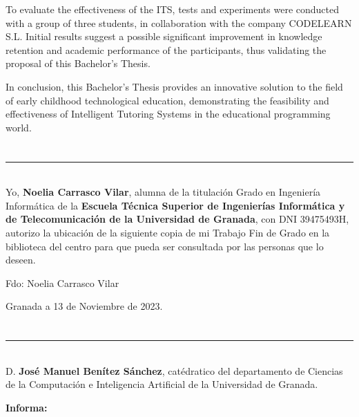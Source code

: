 To evaluate the effectiveness of the ITS, tests and experiments were conducted with a group of three students, in collaboration with the company CODELEARN S.L. Initial results suggest a possible significant improvement in knowledge retention and academic performance of the participants, thus validating the proposal of this Bachelor's Thesis.

In conclusion, this Bachelor's Thesis provides an innovative solution to the field of early childhood technological education, demonstrating the feasibility and effectiveness of Intelligent Tutoring Systems in the educational programming world.

\chapter*{}
\thispagestyle{empty}

\noindent\rule[-1ex]{\textwidth}{2pt}\\[4.5ex]

Yo, \textbf{Noelia Carrasco Vilar}, alumna de la titulación Grado en Ingeniería Informática de la \textbf{Escuela Técnica Superior
de Ingenierías Informática y de Telecomunicación de la Universidad de
Granada}, con DNI 39475493H, autorizo la
ubicación de la siguiente copia de mi Trabajo Fin de Grado en la biblioteca
del centro para que pueda ser
consultada por las personas que lo deseen.

\vspace{6cm}

\noindent Fdo: Noelia Carrasco Vilar

\vspace{2cm}

\begin{flushright}
Granada a 13 de Noviembre de 2023.
\end{flushright}


\chapter*{}
\thispagestyle{empty}

\noindent\rule[-1ex]{\textwidth}{2pt}\\[4.5ex]

D. \textbf{José Manuel Benítez Sánchez}, catédratico del departamento de Ciencias de la Computación e Inteligencia Artificial de la Universidad de Granada.


\vspace{0.5cm}

\textbf{Informa:}

